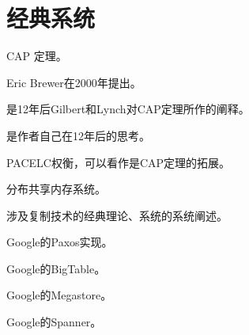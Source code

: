 \chapter{经典系统}

\begin{theorem}
    
    CAP 定理。
    
    Eric Brewer在2000年提出。
    
    \emph{\cite{Gilbert12}}是12年后Gilbert和Lynch对CAP定理所作的阐释。
    
    \emph{\cite{Brewer12}}是作者自己在12年后的思考。
    
\end{theorem}

\begin{theorem}
    
    PACELC权衡，可以看作是CAP定理的拓展。
    
\end{theorem}

\begin{theorem}[\cite{Li89}]
    
    分布共享内存系统。
    
\end{theorem}

\begin{theorem}
    
    涉及复制技术的经典理论、系统的系统阐述。
    
\end{theorem}

\begin{theorem}
    
    Google的Paxos实现。
    
\end{theorem}

\begin{theorem}
    
    Google的BigTable。
    
\end{theorem}

\begin{theorem}
    
    Google的Megastore。
    
\end{theorem}

\begin{theorem}
    
    Google的Spanner。
    
\end{theorem}

